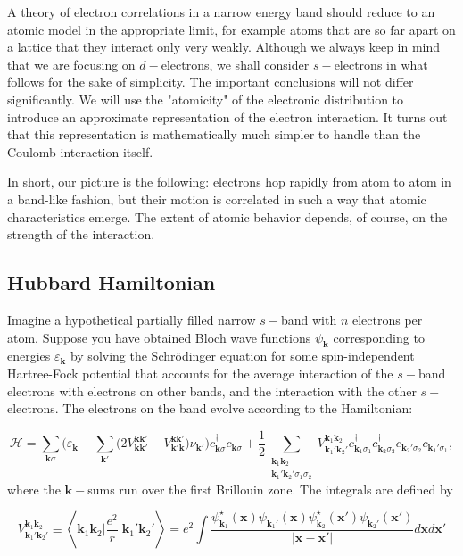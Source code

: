 A theory of electron correlations in a narrow energy band should reduce to an atomic model in the appropriate limit, for example atoms that are so far apart on a lattice that they interact only very weakly.
Although we always keep in mind that we are focusing on $d-$electrons, we shall consider $s-$electrons in what follows for the sake of simplicity.
The important conclusions will not differ significantly.
We will use the "atomicity" of the electronic distribution to introduce an approximate representation of the electron interaction.
It turns out that this representation is mathematically much simpler to handle than the Coulomb interaction itself.

In short, our picture is the following: electrons hop rapidly from atom to atom in a band-like fashion, but their motion is correlated in such a way that atomic characteristics emerge.
The extent of atomic behavior depends, of course, on the strength of the interaction.

\subsection{Hubbard Hamiltonian}\label{subsec:hubbardHamiltonian}

Imagine a hypothetical partially filled narrow $s-$band with $n$ electrons per atom.
Suppose you have obtained Bloch wave functions $\psi_{\bm k}$ corresponding to energies $\varepsilon_{\bm k}$ by solving the Schr\"odinger equation for some spin-independent Hartree-Fock potential that accounts for the average interaction of the $s-$band electrons with electrons on other bands, and the interaction with the other $s-$electrons.
The electrons on the band evolve according to the Hamiltonian:

\begin{equation}\label{eq:startingHamiltonian}
\mathcal{H} = \sum_{\bm k \sigma} \bigg( \varepsilon_{\bm k} - \sum_{ \bm k'} \big( 2 V^{\bm k \bm k'}_{\bm k \bm k'} - V^{\bm k \bm k'}_{\bm k' \bm k} \big) \nu_{\bm k'} \bigg) c_{\bm k \sigma}^\dagger c_{\bm k \sigma} +  \frac{1}{2} \sum_{ \substack{\bm k_1 \bm k_2 \\ \bm k_1' \bm k_2'  \sigma_1 \sigma_2 } } V^{\bm k_1 \bm k_2}_{\bm k_1' \bm k_2'}
 c_{\bm k_1 \sigma_1}^\dagger c_{\bm k_2 \sigma_2}^\dagger c_{\bm k_2' \sigma_2} c_{\bm k_1' \sigma_1} ,
\end{equation}
where the $\bm k-$sums run over the first Brillouin zone.
The integrals are defined by

\begin{equation}\label{eq:integrals}
V^{\bm k_1 \bm k_2}_{\bm k_1' \bm k_2'} \equiv \left\langle \bm k_1 \bm k_2 \bigg| \frac{e^2}{r} \bigg| \bm k_1' \bm k_2' \right\rangle  =  e^2 \int \frac{\psi_{\bm k_1}^\star (\bm x) \psi_{\bm k_1'} (\bm x) \psi_{\bm k_2}^\star (\bm x') \psi_{\bm k_2'}(\bm x') }{| \bm x - \bm x' |} d\bm x d\bm x'
\end{equation}

